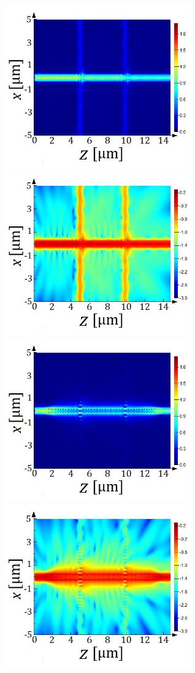 \documentclass[aps,prl,twocolumn, superscriptaddress]{revtex4}
\begin{document}
\begin{figure}[htbp]
    \centering
    \includegraphics[width=8cm]{reg2cross.jpg}
    \includegraphics[width=8cm]{reg2cross_log.jpg}
    \includegraphics[width=8cm]{bridged2cross.jpg}
    \includegraphics[width=8cm]{bridged2cross_log.jpg}
    

\end{figure}
\end{document}

